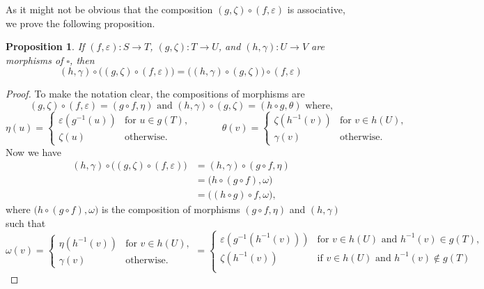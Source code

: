 \documentclass[11pt,a4paper,oldfontcommands]{memoir}
\newtheorem{proposition}[definition]{Proposition}
\begin{document}
As it might not be obvious that the composition $(g,\zeta) \circ (f,\varepsilon) $ is associative, we prove the following proposition.
\begin{proposition}
     If $(f,\varepsilon):S\to T$, $(g,\zeta):T\to U$, and $(h,\gamma):U\to V$ are morphisms of $\square$, then
     $$(h,\gamma) \circ \bigl( (g,\zeta) \circ (f,\varepsilon) \bigl) =  \bigl( (h,\gamma) \circ (g,\zeta) \bigl) \circ (f,\varepsilon) $$
\end{proposition}
\begin{proof}
    To make the notation clear, the compositions of morphisms are  
$$(g,\zeta) \circ (f,\varepsilon)=(g\circ f,\eta) \text{ and } (h,\gamma)\circ (g,\zeta) =(h\circ g,\theta) \text{  where,}$$
    \begin{equation*}
      \eta(u)=
      \begin{cases}
        \varepsilon(g^{-1}(u)) & \text{for $u\in g(T)$}, \\
        \zeta(u) & \text{otherwise}.
      \end{cases}
  \qquad\quad
  \theta(v)=
      \begin{cases}
        \zeta(h^{-1}(v)) & \text{for $v \in h(U)$}, \\
        \gamma(v) & \text{otherwise}.
      \end{cases}
    \end{equation*} %
    Now we have
\begin{align*}
(h,\gamma) \circ \bigl( (g,\zeta) \circ (f,\varepsilon) \bigl)& = (h,\gamma) \circ (g\circ f, \eta) \\
&=\bigl( h \circ (g\circ f), \omega \bigl)  \\
&=\bigl( (h \circ g) \circ f, \omega \bigl),
\end{align*} where $\bigl( h \circ (g\circ f), \omega \bigl)$ is the composition of morphisms $(g\circ f, \eta)$ and $(h,\gamma)$ such that
    \begin{equation*}
      \omega(v)=
      \begin{cases}
        \eta(h^{-1}(v)) & \text{for $v \in h(U)$}, \\
        \gamma(v) & \text{otherwise}.
      \end{cases}=
      \begin{cases}
        \varepsilon(g^{-1}(h^{-1}(v))) & \text{for $v \in h(U)$ and $h^{-1}(v) \in g(T)$}, \\
        \zeta(h^{-1}(v)) & \text{if $v\in h(U)$ and $h^{-1}(v)\notin g(T) $}\\

\end{cases}
\end{equation*}
\end{proof}
\end{document}
